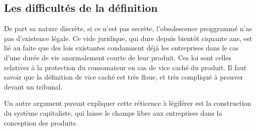 \subsection{Les difficultés de la définition}

De part sa nature discrète, si ce n'est pas secrète, l'obsolescence proggrammé n'as pas d'existence légale. Ce vide juridique, qui dure depuis bientôt ciquante ans, est lié au faite que des lois existantes condamnent déjà les entreprises dans le cas d'une durée de vie anormalement courte de leur produit. Ces loi sont celles relatives à la protection du consomateur en cas de vice caché du produit. Il faut savoir que la définition de vice caché est très floue, et très compliqué à prouver devant un tribunal.

Un autre argument puvant expliquer cette réticence à légiférer est la construction du système capitaliste, qui laisse le champs libre aux entreprises dans la conception des produits.
